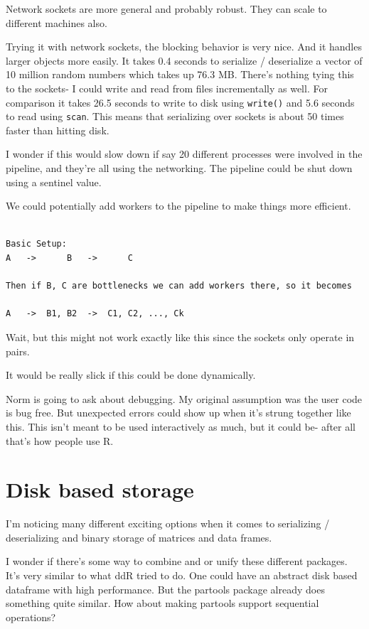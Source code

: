 \documentclass[12pt]{article}
\begin{document}
Network sockets are more general and probably robust. They can scale to
different machines also.

Trying it with network sockets, the blocking behavior is very nice. And it
handles larger objects more easily. It takes 0.4 seconds to serialize /
deserialize a vector of 10 million random numbers which takes up 76.3 MB.
There's nothing tying this to the sockets- I could write and read from
files incrementally as well.  For comparison it takes 26.5 seconds to write
to disk using \texttt{write()} and 5.6 seconds to read using \texttt{scan}.
This means that serializing over sockets is about 50 times faster than
hitting disk.

I wonder if this would slow down if say 20 different processes were
involved in the pipeline, and they're all using the networking.
The pipeline could be shut down using a sentinel value.

We could potentially add workers to the pipeline to make things more
efficient.
\begin{verbatim}

Basic Setup:
A   ->      B   ->      C

Then if B, C are bottlenecks we can add workers there, so it becomes

A   ->  B1, B2  ->  C1, C2, ..., Ck

\end{verbatim}

Wait, but this might not work exactly like this since the sockets only
operate in pairs.

It would be really slick if this could be done dynamically. 

Norm is going to ask about debugging. My original assumption was the user
code is bug free. But unexpected errors could show up when it's strung
together like this. This isn't meant to be used interactively as much, but
it could be- after all that's how people use R.

\section{Disk based storage}

I'm noticing many different exciting options when it comes to serializing /
deserializing and binary storage of matrices and data frames.

I wonder if there's some way to combine and or unify these different
packages. It's very similar to what ddR tried to do. One could have an
abstract disk based dataframe with high performance. But the partools package already does
something quite similar. How about making partools support sequential
operations?
\end{document}

